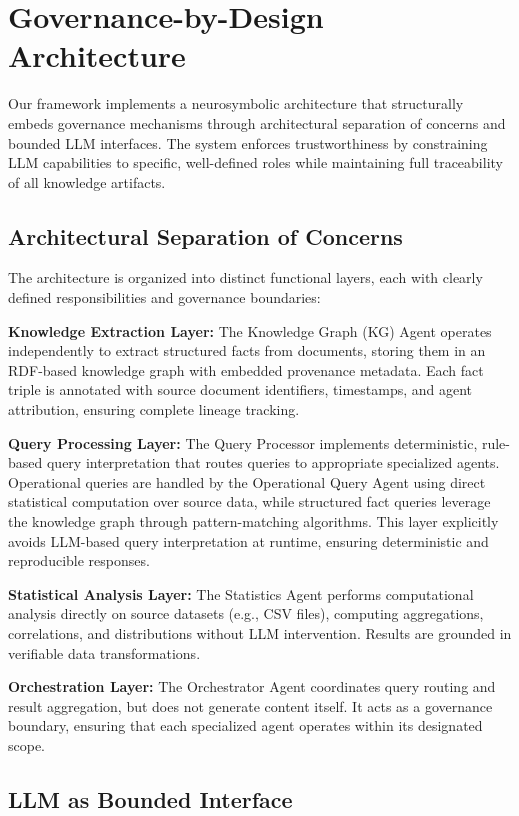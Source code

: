 \section{Governance-by-Design Architecture}

Our framework implements a neurosymbolic architecture that structurally embeds governance mechanisms through architectural separation of concerns and bounded LLM interfaces. The system enforces trustworthiness by constraining LLM capabilities to specific, well-defined roles while maintaining full traceability of all knowledge artifacts.

\subsection{Architectural Separation of Concerns}

The architecture is organized into distinct functional layers, each with clearly defined responsibilities and governance boundaries:

\textbf{Knowledge Extraction Layer:} The Knowledge Graph (KG) Agent operates independently to extract structured facts from documents, storing them in an RDF-based knowledge graph with embedded provenance metadata. Each fact triple is annotated with source document identifiers, timestamps, and agent attribution, ensuring complete lineage tracking.

\textbf{Query Processing Layer:} The Query Processor implements deterministic, rule-based query interpretation that routes queries to appropriate specialized agents. Operational queries are handled by the Operational Query Agent using direct statistical computation over source data, while structured fact queries leverage the knowledge graph through pattern-matching algorithms. This layer explicitly avoids LLM-based query interpretation at runtime, ensuring deterministic and reproducible responses.

\textbf{Statistical Analysis Layer:} The Statistics Agent performs computational analysis directly on source datasets (e.g., CSV files), computing aggregations, correlations, and distributions without LLM intervention. Results are grounded in verifiable data transformations.

\textbf{Orchestration Layer:} The Orchestrator Agent coordinates query routing and result aggregation, but does not generate content itself. It acts as a governance boundary, ensuring that each specialized agent operates within its designated scope.

\subsection{LLM as Bounded Interface}

